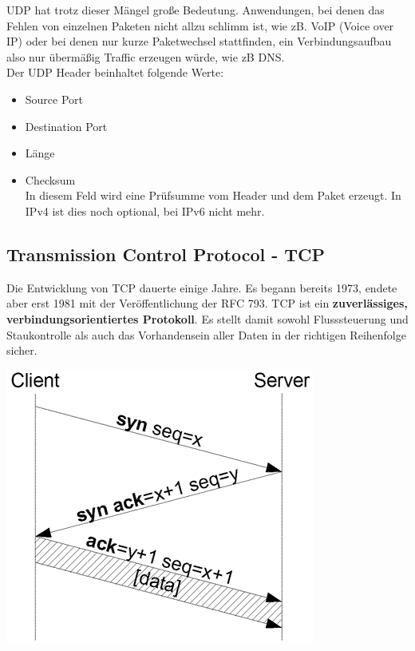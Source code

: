 \documentclass[12pt,a4paper]{report}
\begin{document}
\begin{onehalfspace}
UDP hat trotz dieser Mängel große Bedeutung. Anwendungen, bei denen das Fehlen von einzelnen Paketen nicht allzu schlimm ist, wie zB. VoIP (Voice over IP) oder bei denen nur kurze Paketwechsel stattfinden, ein Verbindungsaufbau also nur übermäßig Traffic erzeugen würde, wie zB DNS.\\

Der UDP Header beinhaltet folgende Werte: 
\begin{itemize}
\item Source Port
\item Destination Port
\item Länge
\item Checksum\\
In diesem Feld wird eine Prüfsumme vom Header und dem Paket erzeugt. In IPv4 ist dies noch optional, bei IPv6 nicht mehr.
\end{itemize}
\subsection{Transmission Control Protocol - TCP}
Die Entwicklung von TCP dauerte einige Jahre. Es begann bereits 1973, endete aber erst 1981 mit der Veröffentlichung der RFC 793. TCP ist ein \textbf{zuverlässiges, verbindungsorientiertes Protokoll}. Es stellt damit sowohl Flusssteuerung und Staukontrolle als auch das Vorhandensein aller Daten in der richtigen Reihenfolge sicher.\\

\begin{center}
\includegraphics[scale=0.6]{../docs/tarkes/pics/TcpHandshake.png}
\end{center}


\end{onehalfspace}
\end{document}
